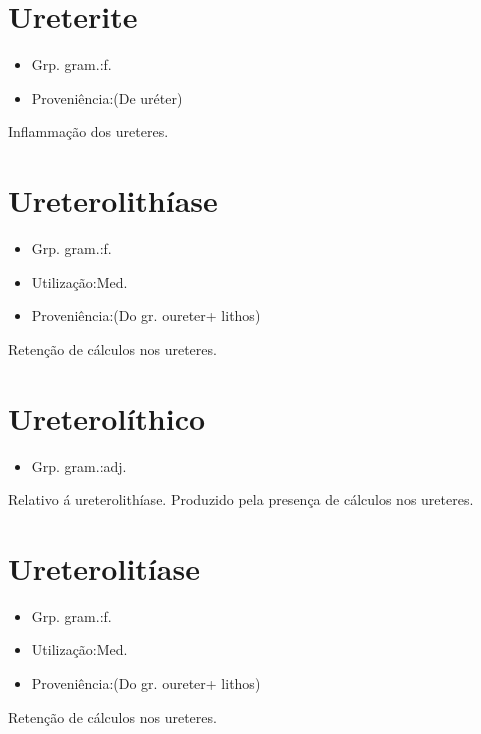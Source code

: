 \documentclass{article}
\begin{document}
\section{Ureterite}
\begin{itemize}
\item {Grp. gram.:f.}
\end{itemize}
\begin{itemize}
\item {Proveniência:(De \textunderscore uréter\textunderscore )}
\end{itemize}
Inflammação dos ureteres.
\section{Ureterolithíase}
\begin{itemize}
\item {Grp. gram.:f.}
\end{itemize}
\begin{itemize}
\item {Utilização:Med.}
\end{itemize}
\begin{itemize}
\item {Proveniência:(Do gr. \textunderscore oureter\textunderscore  + \textunderscore lithos\textunderscore )}
\end{itemize}
Retenção de cálculos nos ureteres.
\section{Ureterolíthico}
\begin{itemize}
\item {Grp. gram.:adj.}
\end{itemize}
Relativo á ureterolithíase.
Produzido pela presença de cálculos nos ureteres.
\section{Ureterolitíase}
\begin{itemize}
\item {Grp. gram.:f.}
\end{itemize}
\begin{itemize}
\item {Utilização:Med.}
\end{itemize}
\begin{itemize}
\item {Proveniência:(Do gr. \textunderscore oureter\textunderscore  + \textunderscore lithos\textunderscore )}
\end{itemize}
Retenção de cálculos nos ureteres.
\end{document}
